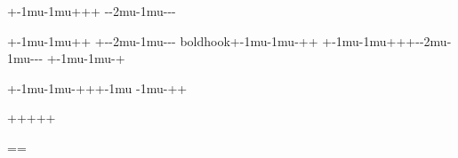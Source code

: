 
\def\rthooka{\raisehook{}+\subset\mkern-1mu}%
\def\lthooka{\mkern-1mu\raisehook{}+\supset}%
\def\rthookb{\raisehook{}-\subset\mkern-2mu}%
\def\lthookb{\mkern-1mu\raisehook{}-\supset}%

\def\dthooka{\shifthook{}+\cap}%
\def\dthookb{\shifthook{}-\cap}%
\def\uthooka{\shifthook{}+\cup}%
\def\uthookb{\shifthook{}-\cup}%

\rthooka\lthooka\dthooka\uthooka{}%
\rthookb\lthookb\dthookb\uthookb

\ifx\boldmath\undefined{}\rthooka\lthooka\dthooka
\uthooka{}\rthookb\lthookb\dthookb\uthookb\newarrowtail
{boldhook}\rthooka\lthookb\dthooka\uthooka\else\def\rtbhooka{\raisehook
\boldmath+\subset\mkern-1mu}%
\def\ltbhooka{\mkern-1mu\raisehook\boldmath+\supset}%
\def\rtbhookb{\raisehook\boldmath-\subset\mkern-2mu}%
\def\ltbhookb{\mkern-1mu\raisehook\boldmath-\supset}%
\def\dtbhooka{\shifthook\boldmath+\cap}%
\def\dtbhookb{\shifthook\boldmath-\cap}%
\def\utbhooka{\shifthook\boldmath+\cup}%
\def\utbhookb{\shifthook\boldmath-\cup}%
\rtbhooka\ltbhooka\dtbhooka\utbhooka{}\rtbhookb\ltbhookb\dtbhookb\utbhookb{}%
\rtbhooka\ltbhookb\dthbooka\utbhooka\fi

\rthooka\lthookb\dthooka\uthooka{}\rthooka
\lthookb\dthooka\uthooka

\hho\hho\circ\circ%
\hhO\hhO{\scriptstyle\bigcirc}{\scriptstyle\bigcirc}%

\lhtimes\rhtimes\uhtimes\dhtimes\newarrowtail+++++


\Yright\Yleft\Yup\Ydown




\newarrowfiller{=}=={}{}%
\def\vfthree{\mid\!\!\!\mid\!\!\!\mid}%
\equiv\equiv\vfthree\vfthree

